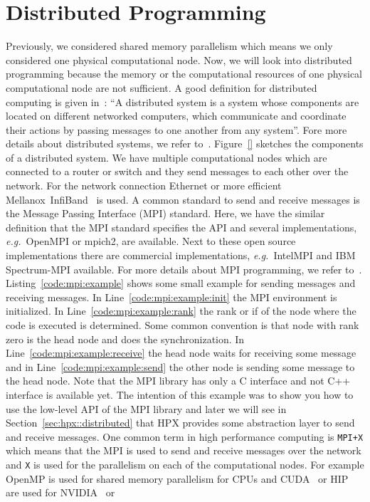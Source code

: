 \chapter{Distributed Programming}
\label{sec:distributed:programming}
Previously, we considered shared memory parallelism which means we only considered one physical computational node. Now, we will look into distributed programming because the memory or the computational resources of one physical computational node are not sufficient. A good definition for distributed computing is given in~\cite{van2002distributed}: ``A distributed system is a system whose components are located on different networked computers, which communicate and coordinate their actions by passing messages to one another from any system''. Fore more details about distributed systems, we refer to~\cite{van2002distributed}. Figure~\ref{} sketches the components of a distributed system. We have multiple computational nodes which are connected to a router or switch and they send messages to each other over the network. For the network connection Ethernet or more efficient Mellanox\textregistered~InfiBand\texttrademark~ is used. A common standard to send and receive messages is the Message Passing Interface (MPI) standard. Here, we have the similar definition that the MPI standard specifies the API and several implementations, \emph{e.g.}\ OpenMPI or mpich2, are available. Next to these open source implementations there are commercial implementations, \emph{e.g.}\ IntelMPI and IBM Spectrum-MPI available. For more details about MPI programming, we refer to~\cite{gropp1999using}. Listing~\ref{code:mpi:example} shows some small example for sending messages and receiving messages. In Line~\ref{code:mpi:example:init} the MPI environment is initialized. In Line~\ref{code:mpi:example:rank} the rank or if of the node where the code is executed is determined. Some common convention is that node with rank zero is the head node and does the synchronization. In Line~\ref{code:mpi:example:receive} the head node waits for receiving some message and in Line~\ref{code:mpi:example:send} the other node is sending some message to the head node. Note that the MPI library has only a C interface and not C++ interface is available yet. The intention of this example was to show you how to use the low-level API of the MPI library and later we will see in Section~\ref{sec:hpx::distributed} that HPX provides some abstraction layer to send and receive messages. One common term in high performance computing is \texttt{MPI+X} which means that the MPI is used to send and receive messages over the network and \texttt{X} is used for the parallelism on each of the computational nodes. For example OpenMP is used for shared memory parallelism for CPUs and CUDA\texttrademark~ or HIP\texttrademark{}~ are used for NVIDIA\texttrademark~ or 